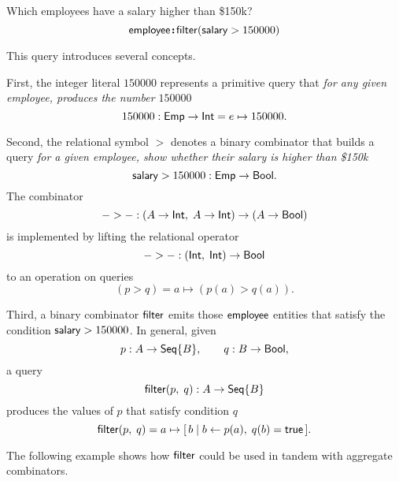 \begin{demo}
    \label{ex:filter-by-salary}
    Which employees have a salary higher than \$150k?
    \begin{equation*}
        \mathsf{employee}\!\boldsymbol{:}\!\mathsf{filter}(\mathsf{salary}>150000)
    \end{equation*}
\end{demo}

This query introduces several concepts.

First, the integer literal $150000$ represents a primitive query that
\emph{for any given employee, produces the number $150000$}
\begin{equation*}
    150000 : \mathsf{Emp} \to \mathsf{Int} = e \mapsto 150000.
\end{equation*}

Second, the relational symbol ${>}$ denotes a binary combinator that builds a
query \emph{for a given employee, show whether their salary is higher than
\$150k}
\begin{equation*}
    \mathsf{salary} > 150000 : \mathsf{Emp} \to \mathsf{Bool}.
\end{equation*}
The combinator
\begin{equation*}
    {-}>{-} : (A \to \mathsf{Int},\; A \to \mathsf{Int}) \to (A \to \mathsf{Bool})
\end{equation*}
is implemented by lifting the relational operator
\begin{equation*}
    {-}>{-} : (\mathsf{Int},\; \mathsf{Int}) \to \mathsf{Bool}
\end{equation*}
to an operation on queries
\begin{equation*}
    (p > q) = a \mapsto (p(a) > q(a)).
\end{equation*}

Third, a binary combinator $\mathsf{filter}$ emits those $\mathsf{employee}$ entities that
satisfy the condition $\mathsf{salary} > 150000$.  In general, given
\begin{equation*}
    p : A \to \mathsf{Seq}{\left\{B\right\}}, \qquad q : B \to \mathsf{Bool},
\end{equation*}
a query
\begin{equation*}
    \mathsf{filter}(p,\; q) : A \to \mathsf{Seq}{\left\{B\right\}}
\end{equation*}
produces the values of $p$ that satisfy condition $q$
\begin{equation*}
    \mathsf{filter}(p,\; q) = a \mapsto [\,b \mid b \gets p(a),\; q(b)=\mathsf{true}\,].
\end{equation*}

The following example shows how $\mathsf{filter}$ could be used in tandem with
aggregate combinators.

